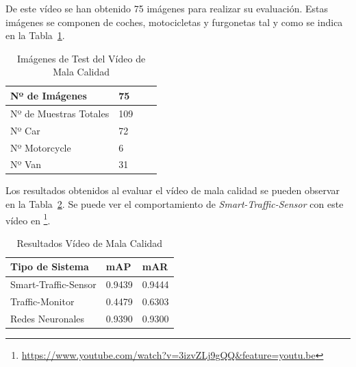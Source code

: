 De este vídeo se han obtenido 75 imágenes para realizar su evaluación. Estas imágenes se componen de coches, motocicletas y furgonetas tal y como se indica en la Tabla~\ref{tabla_video_mala_calidad}. 

\begin{table}[H] 
\begin{center}
\begin{tabular}{|l|l|l|l|}
\hline
Nº de Imágenes  & 75 \\
\hline \hline
Nº de Muestras Totales & 109\\ \hline
Nº Car & 72 \\ \hline
Nº Motorcycle & 6 \\ \hline
Nº Van & 31 \\ \hline
\end{tabular}
\caption{Imágenes de Test del Vídeo de Mala Calidad}
\label{tabla_video_mala_calidad}
\end{center}
\end{table}

Los resultados obtenidos al evaluar el vídeo de mala calidad se pueden observar en la Tabla~\ref{resultados_video_mala_calidad}. Se puede ver el comportamiento de \textit{Smart-Traffic-Sensor} con este vídeo en \footnote{\url{https://www.youtube.com/watch?v=3izvZLj9gQQ&feature=youtu.be}}.

\begin{table}[H] 
\begin{center}
\begin{tabular}{|l|l|l|}
\hline
Tipo de Sistema & mAP & mAR  \\ 
\hline \hline
Smart-Traffic-Sensor & 0.9439 & 0.9444 \\ \hline
Traffic-Monitor & 0.4479 & 0.6303 \\ \hline
Redes Neuronales & 0.9390 & 0.9300\\ \hline
\end{tabular}
\caption{Resultados Vídeo de Mala Calidad}
\label{resultados_video_mala_calidad}
\end{center}
\end{table}

